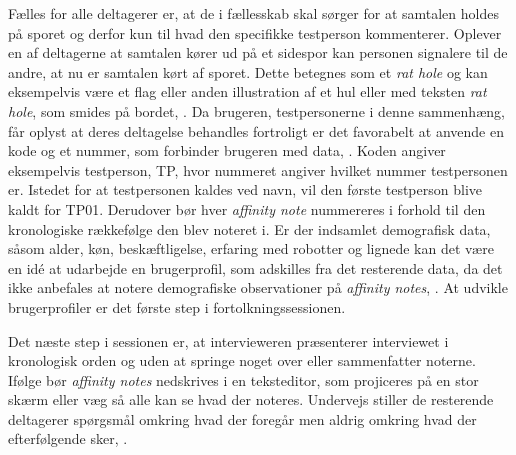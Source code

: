 Fælles for alle deltagerer er, at de i fællesskab skal sørger for at samtalen holdes på sporet og derfor kun til hvad den specifikke testperson kommenterer. Oplever en af deltagerne at samtalen kører ud på et sidespor kan personen signalere til de andre, at nu er samtalen kørt af sporet. Dette betegnes som et \textit{rat hole} og kan eksempelvis være et flag eller anden illustration af et hul eller med teksten \textit{rat hole}, som smides på bordet, \parencite[s. 109]{Book:CIInterpretationSession}.\blankline
%   
Da brugeren, testpersonerne i denne sammenhæng, får oplyst at deres deltagelse behandles fortroligt er det favorabelt at anvende en kode og et nummer, som forbinder brugeren med data, \parencite[s. 111]{Book:CIInterpretationSession}. Koden angiver eksempelvis testperson, TP, hvor nummeret angiver hvilket nummer testpersonen er. Istedet for at testpersonen kaldes ved navn, vil den første testperson blive kaldt for TP01. Derudover bør hver \textit{affinity note} nummereres i forhold til den kronologiske rækkefølge den blev noteret i. Er der indsamlet demografisk data, såsom alder, køn, beskæftligelse, erfaring med robotter og lignede kan det være en idé at udarbejde en brugerprofil, som adskilles fra det resterende data, da det ikke anbefales at notere demografiske observationer på \textit{affinity notes}, \parencite[s. 109]{Book:CIInterpretationSession}. At udvikle brugerprofiler er det første step i fortolkningssessionen. 

Det næste step i sessionen er, at intervieweren præsenterer interviewet i kronologisk orden og uden at springe noget over eller sammenfatter noterne. Ifølge \textcite[s. 113]{Book:CIInterpretationSession} bør \textit{affinity notes} nedskrives i en teksteditor, som projiceres på en stor skærm eller væg så alle kan se hvad der noteres. Undervejs stiller de resterende deltagerer spørgsmål omkring hvad der foregår men aldrig omkring hvad der efterfølgende sker, \parencite[s. 114]{Book:CIInterpretationSession}.

